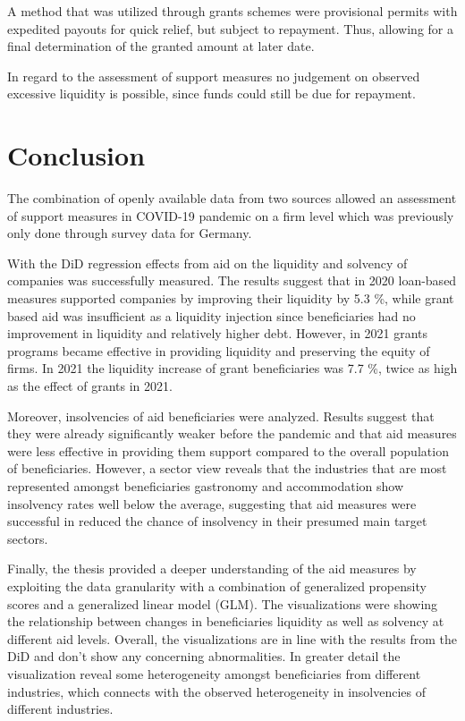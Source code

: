 A method that was utilized through grants schemes were provisional permits with expedited payouts for quick relief, but subject to repayment. Thus, allowing for a final determination of the granted amount at later date. 

In regard to the assessment of support measures no judgement on observed excessive liquidity is possible, since funds could still be due for repayment.





\section{Conclusion}

The combination of openly available data from two sources allowed an assessment of support measures in COVID-19 pandemic on a firm level which was previously only done through survey data for Germany.

With the DiD regression effects from aid on the liquidity and solvency of companies was successfully measured. The results suggest that in 2020 loan-based measures supported companies by improving their liquidity by 5.3 \%, while grant based aid was insufficient as a liquidity injection since beneficiaries had no improvement in liquidity and relatively higher debt. However, in 2021 grants programs became effective in providing liquidity and preserving the equity of firms. In 2021 the liquidity increase of grant beneficiaries was 7.7 \%, twice as high as the effect of grants in 2021. 

Moreover, insolvencies of aid beneficiaries were analyzed. Results suggest that they were already significantly weaker before the pandemic and that aid measures were less effective in providing them support compared to the overall population of beneficiaries. However, a sector view reveals that the industries that are most represented amongst beneficiaries gastronomy and accommodation show insolvency rates well below the average, suggesting that aid measures were successful in reduced the chance of insolvency in their presumed main target sectors.

Finally, the thesis provided a deeper understanding of the aid measures by exploiting the data granularity with a combination of generalized propensity scores and a generalized linear model (GLM). The visualizations were showing the relationship between changes in beneficiaries liquidity as well as solvency at different aid levels. Overall, the visualizations are in line with the results from the DiD and don't show any concerning abnormalities. In greater detail the visualization reveal some heterogeneity amongst beneficiaries from different industries, which connects with the observed heterogeneity in insolvencies of different industries.

